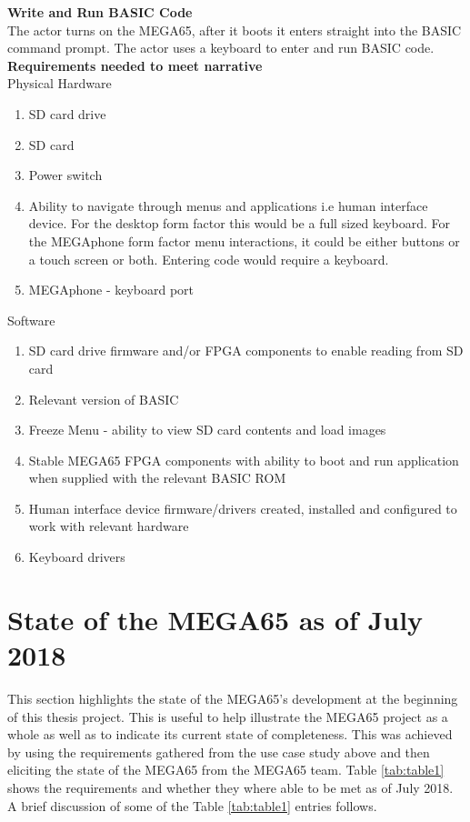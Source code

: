 \textbf{Write and Run BASIC Code}\\
The actor turns on the MEGA65, after it boots it enters straight into the BASIC command prompt. The actor uses a keyboard to enter and run BASIC code. \\

\textbf{Requirements needed to meet narrative}\\
Physical Hardware
\begin{enumerate}
\item SD card drive
\item SD card
\item Power switch
\item Ability to navigate through menus and applications i.e human interface device. For the desktop form factor this would be a full sized keyboard. For the MEGAphone form factor menu interactions, it could be either buttons or a touch screen or both. Entering code would require a keyboard.
\item MEGAphone - keyboard port
\end{enumerate}

Software\\
\begin{enumerate}
\item SD card drive firmware and/or FPGA components to enable reading from SD card
\item Relevant version of BASIC 
\item Freeze Menu - ability to view SD card contents and load images
\item Stable MEGA65 FPGA components with ability to boot and run application when supplied with the relevant BASIC ROM
\item Human interface device firmware/drivers created, installed and configured to work with relevant hardware
\item Keyboard drivers
\end{enumerate}

\section{State of the MEGA65 as of July 2018}
This section highlights the state of the MEGA65's development at the beginning of this thesis project. This is useful to help illustrate the MEGA65 project as a whole as well as to indicate its current state of completeness. This was achieved by using the requirements gathered from the use case study above and then eliciting the state of the MEGA65 from the MEGA65 team. Table \ref{tab:table1} shows the requirements and whether they where able to be met as of July 2018. A brief discussion of some of the Table \ref{tab:table1} entries follows. 

